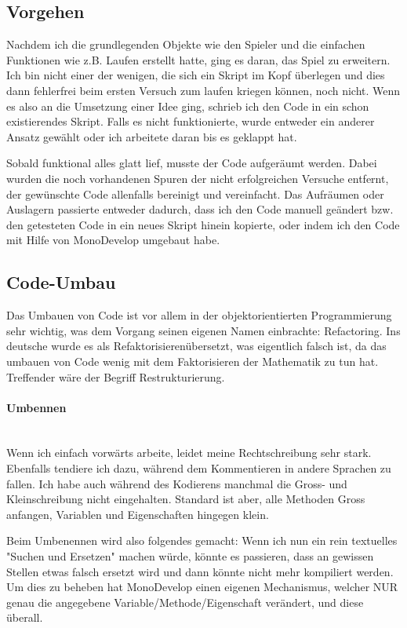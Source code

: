 \subsection{Vorgehen}
Nachdem ich die grundlegenden Objekte wie den Spieler und die einfachen Funktionen wie z.B. Laufen erstellt hatte, ging es daran, das Spiel zu erweitern. Ich bin nicht einer der wenigen, die sich ein Skript im Kopf überlegen und dies dann fehlerfrei beim ersten Versuch zum laufen kriegen können, noch nicht. Wenn es also an die Umsetzung einer Idee ging, schrieb ich den Code in ein schon existierendes Skript.
Falls es nicht funktionierte, wurde entweder ein anderer Ansatz gewählt oder ich arbeitete daran bis es geklappt hat.

Sobald funktional alles glatt lief, musste der Code aufgeräumt werden. Dabei wurden die noch vorhandenen Spuren der nicht erfolgreichen Versuche entfernt, der gewünschte Code allenfalls bereinigt und vereinfacht. Das Aufräumen oder Auslagern passierte entweder dadurch, dass ich den Code manuell geändert bzw. den getesteten Code in ein neues Skript hinein kopierte, oder indem ich den Code mit Hilfe von MonoDevelop umgebaut habe.

\subsection{Code-Umbau}
\label{subsubsec:refactoring}
Das Umbauen von Code ist vor allem in der objektorientierten Programmierung sehr wichtig, was dem Vorgang seinen eigenen Namen einbrachte: Refactoring. Ins deutsche wurde es als \glqq Refaktorisieren\grqq übersetzt, was eigentlich falsch ist, da das umbauen von Code wenig mit  dem Faktorisieren der Mathematik zu tun hat.
Treffender wäre der Begriff \glqq Restrukturierung\grqq.


\paragraph{Umbennen}\mbox{} \\
Wenn ich einfach vorwärts arbeite, leidet meine Rechtschreibung sehr stark. Ebenfalls tendiere ich dazu, während dem Kommentieren in andere Sprachen zu fallen. Ich habe auch während des Kodierens manchmal die Gross- und Kleinschreibung nicht eingehalten. Standard ist aber, alle Methoden Gross anfangen, Variablen und Eigenschaften hingegen klein.

Beim Umbenennen wird also folgendes gemacht:
Wenn ich nun ein rein textuelles "Suchen und Ersetzen" machen würde, könnte es passieren, dass an gewissen Stellen etwas falsch ersetzt wird und dann könnte nicht mehr kompiliert werden.
Um dies zu beheben hat MonoDevelop einen eigenen Mechanismus, welcher NUR genau die angegebene Variable/Methode/Eigenschaft verändert, und diese überall.

